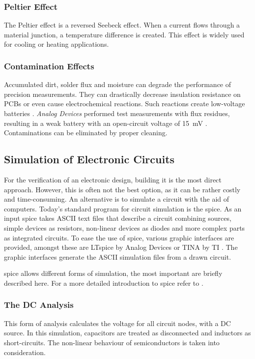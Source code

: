 \subsubsection*{Peltier Effect}
The Peltier effect is a reversed Seebeck effect. When a current flows through a material junction, a temperature difference is created. This effect is widely used for cooling or heating applications. 

\subsubsection{Contamination Effects}
Accumulated dirt, solder flux and moisture can degrade the performance of precision measurements. They can drastically decrease insulation resistance on \acp{PCB} or even cause electrochemical reactions. Such reactions create low-voltage batteries \cite{lowlvl}. \textit{Analog Devices} performed test measurements with flux residues, resulting in a weak battery with an open-circuit voltage of \SI{15}{\milli\volt} \cite{ADA4530}. Contaminations can be eliminated by proper cleaning.

\subsection{Simulation of Electronic Circuits}
For the verification of an electronic design, building it is the most direct approach. However, this is often not the best option, as it can be rather costly and time-consuming. An alternative is to simulate a circuit with the aid of computers. Today's standard program for circuit simulation is the \ac{spice}. As an input \ac{spice} takes ASCII text files that describe a circuit combining sources, simple devices as resistors, non-linear devices as diodes and more complex parts as integrated circuits. %
To ease the use of \ac{spice}, various graphic interfaces are provided, amongst these are LTspice by Analog Devices \cite{LTspice} or TINA by \ac{TI} \cite{LTspice}. The graphic interfaces generate the ASCII simulation files from a drawn circuit.

\ac{spice} allows different forms of simulation, the most important are briefly described here. For a more detailed introduction to \ac{spice} refer to \cite{spice}.
\subsubsection*{The DC Analysis} 
This form of analysis calculates the voltage for all circuit nodes, with a DC source. In this simulation, capacitors are treated as disconnected and inductors as short-circuits. The non-linear behaviour of semiconductors is taken into consideration.
